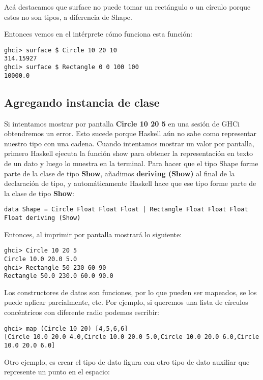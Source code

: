 Acá destacamos que surface no puede tomar un rectángulo o un círculo porque estos no son tipos, a diferencia de Shape.

Entonces vemos en el intérprete cómo funciona esta función:

\begin{lstlisting}
ghci> surface $ Circle 10 20 10
314.15927
ghci> surface $ Rectangle 0 0 100 100
10000.0
\end{lstlisting}

\subsection{Agregando instancia de clase} %
\label{sub:agregando_instancia_de_clase}

Si intentamos mostrar por pantalla \textbf{Circle 10 20 5} en una sesión de GHCi obtendremos un error.
Esto sucede porque Haskell aún no sabe como representar nuestro tipo con una cadena. Cuando intentamos mostrar un valor por pantalla, primero Haskell ejecuta la función show para obtener la representación en texto de un dato y luego lo muestra en la terminal. Para hacer que el tipo Shape forme parte de la clase de tipo \textbf{Show}, añadimos \textbf{deriving (Show)} al final de la declaración de tipo, y automáticamente Haskell hace que ese tipo forme parte de la clase de tipo \textbf{Show}:

\begin{lstlisting}
data Shape = Circle Float Float Float | Rectangle Float Float Float Float deriving (Show)
\end{lstlisting}

Entonces, al imprimir por pantalla mostrará lo siguiente:

\begin{lstlisting}
ghci> Circle 10 20 5
Circle 10.0 20.0 5.0
ghci> Rectangle 50 230 60 90
Rectangle 50.0 230.0 60.0 90.0
\end{lstlisting}

Los constructores de datos son funciones, por lo que pueden ser mapeados, se los puede aplicar parcialmente, etc.
Por ejemplo, si queremos una lista de círculos concéntricos con diferente radio podemos escribir:

\begin{lstlisting}
ghci> map (Circle 10 20) [4,5,6,6]
[Circle 10.0 20.0 4.0,Circle 10.0 20.0 5.0,Circle 10.0 20.0 6.0,Circle 10.0 20.0 6.0]
\end{lstlisting}

Otro ejemplo, es crear el tipo de dato figura con otro tipo de dato auxiliar  que represente un punto en el espacio:

